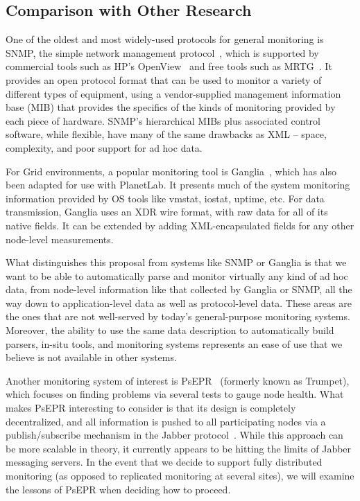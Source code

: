 


\subsection{Comparison with Other Research}
\label{ssec:related}

One of the oldest and most widely-used protocols for general monitoring
is SNMP, the simple network management protocol~\cite{snmprfc1157},
which is supported by commercial tools such as HP's
OpenView~\cite{openview} and free tools such as MRTG~\cite{mrtg}. It
provides an open protocol format that can be used to monitor a variety
of different types of equipment, using a vendor-supplied management
information base (MIB) that provides the specifics of the kinds of
monitoring provided by each piece of hardware. SNMP's hierarchical
MIBs plus associated control software, while flexible, have many of
the same drawbacks as XML -- space, complexity, and poor support for
ad hoc data.

For Grid environments, a popular monitoring tool is
Ganglia~\cite{ganglia}, which has also been adapted for use with
PlanetLab. It presents much of the system monitoring information
provided by OS tools like vmstat, iostat, uptime, etc. For data
transmission, Ganglia uses an XDR wire format, with raw data for all
of its native fields.  It can be extended by adding XML-encapsulated
fields for any other node-level measurements. 

What distinguishes this proposal from systems like SNMP or Ganglia is
that we want to be able to automatically parse and monitor virtually
any kind of ad hoc data, from node-level information like that
collected by Ganglia or SNMP, all the way down to application-level
data as well as protocol-level data. These areas are the ones that are
not well-served by today's general-purpose monitoring
systems. Moreover, the ability to use the same data description to
automatically build parsers, in-situ tools, and monitoring systems
represents an ease of use that we believe is not available in other
systems.

Another monitoring system of interest is PsEPR~\cite{psepr} (formerly
known as Trumpet), which focuses on finding problems via several tests
to gauge node health. What makes PsEPR interesting to consider is that
its design is completely decentralized, and all information is pushed
to all participating nodes via a publish/subscribe mechanism in the
Jabber protocol~\cite{jabber}. While this approach can be more
scalable in theory, it currently appears to be hitting the limits of
Jabber messaging servers. In the event that we decide to support
fully distributed monitoring (as opposed to replicated monitoring at
several sites), we will examine the lessons of PsEPR when deciding how
to proceed.


